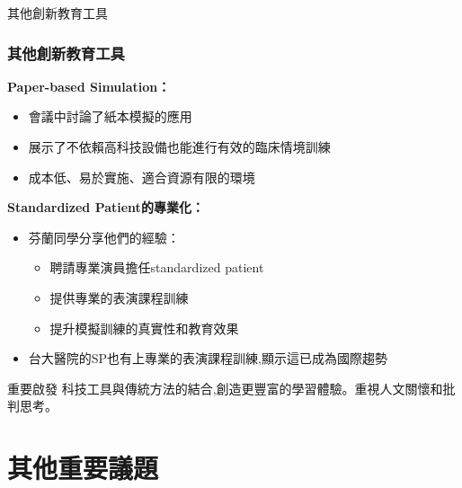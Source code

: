 \documentclass[aspectratio=169]{beamer}
\begin{document}
\begin{frame}{其他創新教育工具}
\frametitle{其他創新教育工具}

\textbf{Paper-based Simulation：}
\begin{itemize}
    \item 會議中討論了紙本模擬的應用
    \item 展示了不依賴高科技設備也能進行有效的臨床情境訓練
    \item 成本低、易於實施、適合資源有限的環境
\end{itemize}

\vspace{0.5cm}

\textbf{Standardized Patient的專業化：}
\begin{itemize}
    \item 芬蘭同學分享他們的經驗：
    \begin{itemize}
        \item 聘請專業演員擔任standardized patient
        \item 提供專業的表演課程訓練
        \item 提升模擬訓練的真實性和教育效果
    \end{itemize}
    \item 台大醫院的SP也有上專業的表演課程訓練,顯示這已成為國際趨勢
\end{itemize}

\vspace{0.3cm}

\begin{alertblock}{重要啟發}
科技工具與傳統方法的結合,創造更豐富的學習體驗。重視人文關懷和批判思考。
\end{alertblock}
\end{frame}

\section{其他重要議題}
\end{document}
